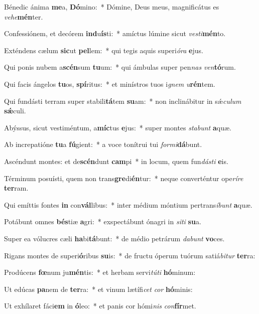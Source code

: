 \item Bénedic ánima \textbf{me}a, \textbf{Dó}mino:~* Dómine, Deus meus, magnificátus es \textit{ve}\textit{he}\textbf{mén}ter.
\item Confessiónem, et decórem \textbf{ind}u\textbf{ís}ti:~* amíctus lúmine sicut \textit{ves}\textit{ti}\textbf{mén}to.
\item Exténdens cælum \textbf{sic}ut \textbf{pel}lem:~* qui tegis aquis superi\textit{ó}\textit{ra} \textbf{e}jus.
\item Qui ponis nubem a\textbf{scén}sum \textbf{tu}um:~* qui ámbulas super pen\textit{nas} \textit{ven}\textbf{tó}rum.
\item Qui facis ángelos \textbf{tu}os, \textbf{spí}ritus:~* et minístros tuos i\textit{gnem} \textit{u}\textbf{rén}tem.
\item Qui fundásti terram super stabili\textbf{tá}tem \textbf{su}am:~* non inclinábitur in sǽ\textit{cu}\textit{lum} \textbf{sǽ}culi.
\item Abýssus, sicut vestiméntum, a\textbf{míc}tus \textbf{e}jus:~* super montes \textit{sta}\textit{bunt} \textbf{a}quæ.
\item Ab increpatióne \textbf{tu}a \textbf{fú}gient:~* a voce tonítrui tui \textit{for}\textit{mi}\textbf{dá}bunt.
\item Ascéndunt montes: et de\textbf{scén}dunt \textbf{cam}pi~* in locum, quem fun\textit{dás}\textit{ti} \textbf{e}is.
\item Términum posuísti, quem non trans\textbf{gre}di\textbf{én}tur:~* neque converténtur ope\textit{rí}\textit{re} \textbf{ter}ram.
\item Qui emíttis fontes \textbf{in} con\textbf{vál}libus:~* inter médium móntium pertrans\textit{í}\textit{bunt} \textbf{a}quæ.
\item Potábunt omnes \textbf{bés}tiæ \textbf{a}gri:~* exspectábunt ónagri in \textit{si}\textit{ti} \textbf{su}a.
\item Super ea vólucres cæli \textbf{ha}bi\textbf{tá}bunt:~* de médio petrárum \textit{da}\textit{bunt} \textbf{vo}ces.
\item Rigans montes de superi\textbf{ó}ribus \textbf{su}is:~* de fructu óperum tuórum satiá\textit{bi}\textit{tur} \textbf{ter}ra:
\item Prodúcens \textbf{fœ}num ju\textbf{mén}tis:~* et herbam servi\textit{tú}\textit{ti} \textbf{hó}minum:
\item Ut edúcas \textbf{pa}nem de \textbf{ter}ra:~* et vinum lætífi\textit{cet} \textit{cor} \textbf{hó}minis:
\item Ut exhílaret fáci\textbf{em} in \textbf{ó}leo:~* et panis cor hómi\textit{nis} \textit{con}\textbf{fír}met.
